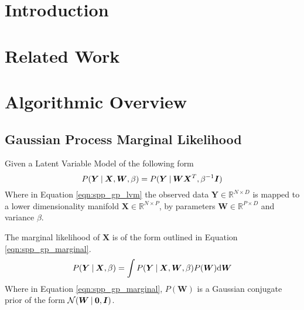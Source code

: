 \section{Introduction}
\label{sec:spp_introduction}
% 

\section{Related Work}
\label{sec:spp_related}

\section{Algorithmic Overview}
\label{sec:spp_algorithm}
\subsection{Gaussian Process Marginal Likelihood}
\label{subsec:spp_gp_marginal_likelihood}
Given a Latent Variable Model of the following form
\begin{equation}
  \label{eqn:spp_gp_lvm}
  P(\bm{Y} \:\vert\: \bm{X}, \bm{W}, \beta) = P(\bm{Y} \:\vert\: \bm{WX}^{T}, \beta^{-1}\bm{I})
\end{equation}
Where in Equation \ref{eqn:spp_gp_lvm} the observed data $\bm{Y} \in \mathbb{R}^{N \times D}$ 
is mapped to a lower dimensionality manifold $\bm{X} \in \mathbb{R}^{N \times P}$, by parameters 
$\bm{W} \in \mathbb{R}^{P \times D}$ and variance $\beta$.

The marginal likelihood of $\bm{X}$ is of the form outlined in Equation \ref{eqn:spp_gp_marginal}.
\begin{equation}
  \label{eqn:spp_gp_marginal}
  P(\bm{Y} \:\vert\: \bm{X}, \beta) = \int P(\bm{Y} \:\vert\: \bm{X}, \bm{W}, \beta) P(\bm{W}) {\mathrm d{\bm{W}}}
\end{equation}
Where in Equation \ref{eqn:spp_gp_marginal}, $P(\bm{W})$ is a Gaussian conjugate prior of the 
form $\mathcal{N}(\bm{W} \:\vert\: \bm{0}, \bm{I})$.

